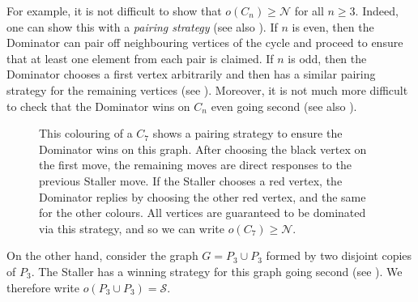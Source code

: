 \documentclass[a4paper,11pt,oneside]{scrartcl}
\theoremstyle{definition}
\theoremstyle{remark}
\begin{document}
For example, it is not difficult to show that $o(C_n) \geq \mathcal N$ for all $n \geq 3$. Indeed, one can show this with a \textit{pairing strategy} (see also \cite{DGPR}).
If $n$ is even, then the Dominator can pair off neighbouring vertices of the cycle and proceed to ensure that at least one element from each pair is claimed.
If $n$ is odd, then the Dominator chooses a first vertex arbitrarily and then has a similar pairing strategy for the remaining vertices (see ).
Moreover, it is not much more difficult to check that the Dominator wins on $C_n$ even going second (see also \cite{DGPR}).

\begin{figure}[ht]
    \centering

    \caption{This colouring of a $C_7$ shows a pairing strategy to ensure the Dominator wins on this graph. After choosing the black vertex on the first move, the remaining moves are direct responses to the previous Staller move. If the Staller chooses a red vertex, the Dominator replies by choosing the other red vertex, and the same for the other colours. All vertices are guaranteed to be dominated via this strategy, and so we can write $o(C_7) \geq \mathcal N$.}
    \label{fig:C7}
\end{figure}

On the other hand, consider the graph $G=P_3 \cup P_3$ formed by two disjoint copies of $P_3$. The Staller has a winning strategy for this graph going second (see ). We therefore write $o(P_3 \cup P_3)= \mathcal S$.
\end{document}
